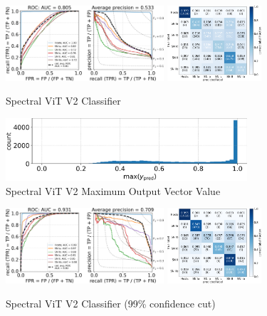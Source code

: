 \begin{frame}
    \begin{figure}[b!]
        \centering
        \includegraphics[height=2.8cm]{figures/v2_real/vit_model_V2rocfulle_e26.png}
        \quad
        \includegraphics[height=2.8cm]{figures/v2_real/vit_model_V2cmfull_e26.png}
        \caption{Spectral ViT V2 Classifier\label{fig:v2_qual}}

        \includegraphics[width=0.8\textwidth]{figures/v2_real/vit_model_V2max_ypred_26.png}
        \caption{Spectral ViT V2 Maximum Output Vector Value\label{fig:v2_max}}
    \end{figure}
\end{frame}

\begin{frame}
    \begin{figure}[b!]
        \centering
        \includegraphics[height=2.8cm]{figures/v2_real/vit_model_V2roc99_e26.png}
        \quad
        \includegraphics[height=2.8cm]{figures/v2_real/vit_model_V2cm99_e26.png}
        \caption{Spectral ViT V2 Classifier (99\% confidence cut)\label{fig:v2_99_qual}}
    \end{figure}
\end{frame}


